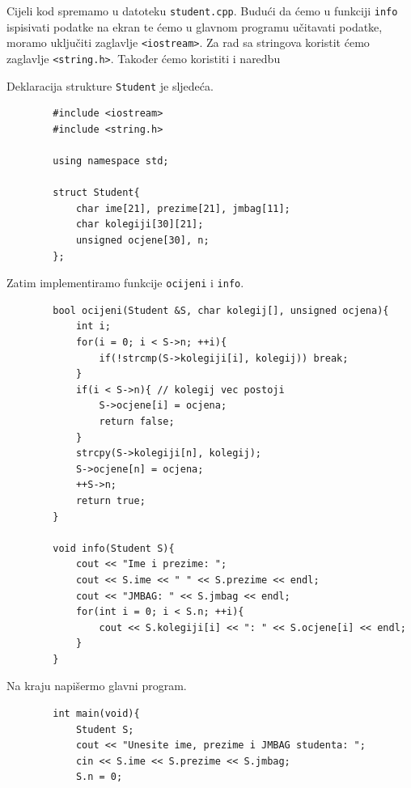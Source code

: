 \begin{rjesenje}
    Cijeli kod spremamo u datoteku \texttt{student.cpp}. 
    Budući da ćemo u funkciji \texttt{info} ispisivati podatke na ekran te ćemo u glavnom programu učitavati podatke, moramo uključiti zaglavlje \texttt{<iostream>}. 
    Za rad sa stringova koristit ćemo zaglavlje \texttt{<string.h>}. Također ćemo koristiti i naredbu 
    
    Deklaracija strukture \texttt{Student} je sljedeća.

    \begin{verbatim}
        #include <iostream>
        #include <string.h>

        using namespace std;

        struct Student{
            char ime[21], prezime[21], jmbag[11];
            char kolegiji[30][21];
            unsigned ocjene[30], n;
        };
    \end{verbatim}

    Zatim implementiramo funkcije \texttt{ocijeni} i \texttt{info}.

    \begin{verbatim}
        bool ocijeni(Student &S, char kolegij[], unsigned ocjena){
            int i;
            for(i = 0; i < S->n; ++i){
                if(!strcmp(S->kolegiji[i], kolegij)) break;
            }
            if(i < S->n){ // kolegij vec postoji
                S->ocjene[i] = ocjena;
                return false;
            }
            strcpy(S->kolegiji[n], kolegij);
            S->ocjene[n] = ocjena;
            ++S->n;
            return true;
        }

        void info(Student S){
            cout << "Ime i prezime: ";
            cout << S.ime << " " << S.prezime << endl;
            cout << "JMBAG: " << S.jmbag << endl;
            for(int i = 0; i < S.n; ++i){
                cout << S.kolegiji[i] << ": " << S.ocjene[i] << endl;
            }
        }
    \end{verbatim}
    
    Na kraju napišermo glavni program.

    \begin{verbatim}
        int main(void){
            Student S;
            cout << "Unesite ime, prezime i JMBAG studenta: ";
            cin << S.ime << S.prezime << S.jmbag;
            S.n = 0;


\end{verbatim}
\end{rjesenje}
